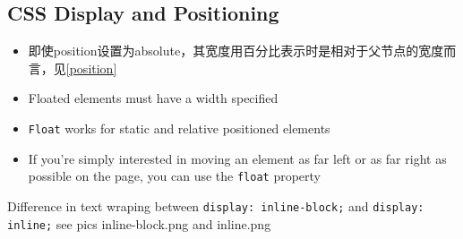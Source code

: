 \documentclass[a4paper, 12pt]{article}
\begin{document}
\subsection{CSS Display and Positioning}
\begin{itemize}
\item 即使position设置为absolute，其宽度用百分比表示时是相对于父节点的宽度而言，见\ref{position}

\item Floated elements must have a width specified

\item \verb|Float| works for static and relative positioned elements

\item  If you're simply interested in moving an element as far left or as far right as possible on the page, you can use the \verb|float| property

\end{itemize}

Difference in text wraping between \verb|display: inline-block;| and \verb|display: inline;| see pics inline-block.png and inline.png
\end{document}
